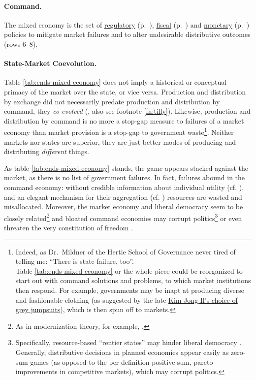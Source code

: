 \paragraph[Command]{Command.}  \label{sec:command} The mixed economy is the set of \hyperref[sec:regulatory]{regulatory} (p.~\pageref{sec:regulatory}), \hyperref[sec:fiscal]{fiscal} (p.~\pageref{sec:fiscal}) and \hyperref[sec:monetary]{monetary} (p.~\pageref{sec:monetary}) policies to mitigate market failures and to alter undesirable distributive outcomes (rows 6--8).

\paragraph{State-Market Coevolution.} Table \ref{tab:ends-mixed-economy} does not imply a historical or conceptual primacy of the market over the state, or vice versa. Production and distribution by exchange did not necessarily predate production and distribution by command, they \emph{co-evolved} (\citealt{Tilly-1985-aa}, also see footnote \ref{fn:tilly}). Likewise, production and distribution by command is no more a stop-gap measure to failures of a market economy than market provision is a stop-gap to government waste\footnote
	{Indeed, as Dr.~Mildner of the Hertie School of Governance never tired of telling me: ``There is state failure, too''. \\
	Table \ref{tab:ends-mixed-economy} or the whole piece could be reorganized to start out with command solutions and problems, to which market institutions then respond. For example, governments may be inapt at producing diverse and fashionable clothing (as suggested by the late \href{http://kimjongillookingatthings.tumblr.com/}{Kim-Jong Il's choice of grey jumpsuits}), which is then spun off to markets.}.
Neither markets nor states are superior, they are just better modes of producing and distributing \emph{different} things.

As table \ref{tab:ends-mixed-economy} stands, the game appears stacked against the market, as there is no list of government failures. In fact, failures abound in the command economy: without credible information about individual utility (cf. \citealt{Hayek1931}), and an elegant mechanism for their aggregation (cf. \citealt{Lerner1944, Lange1934, Debreu1954}) resources are wasted and misallocated. Moreover, the market economy and liberal democracy seem to be closely related\footnote{
	As in modernization theory, for example, \cite{InglehartWelzel-2005-aa}.}
and bloated command economies may corrupt politics\footnote{
	Specifically, resource-based ``rentier states'' may hinder liberal democracy \citep{Beblawi1990}. Generally, distributive decisions in planned economies appear easily as zero-sum games (as opposed to the per-definition positive-sum, pareto improvements in competitive markets), which may corrupt politics.}
or even threaten the very constitution of freedom \citep{Hayek1944, Friedman1962}.

